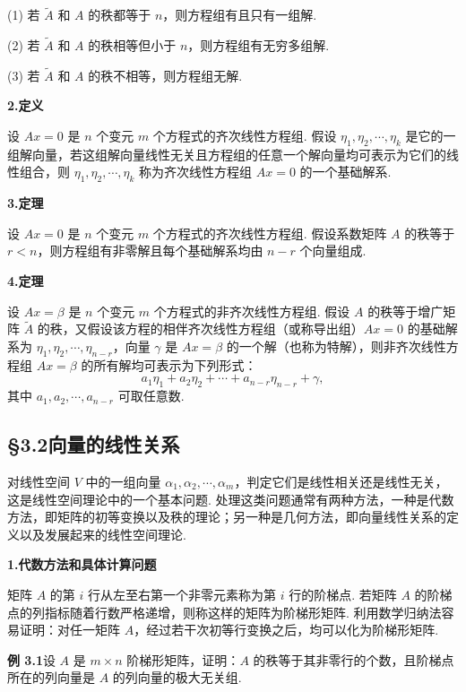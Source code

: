\documentclass[UTF8,12pt,a4paper,fontset=fandol]{ctexart}
\begin{document}
(1) 若 $\widetilde A$ 和 $A$ 的秩都等于 $n$，则方程组有且只有一组解.

(2) 若 $\widetilde A$ 和 $A$ 的秩相等但小于 $n$，则方程组有无穷多组解.

(3) 若 $\widetilde A$ 和 $A$ 的秩不相等，则方程组无解.

\noindent\textbf{2.\quad 定义}

设 $Ax=0$ 是 $n$ 个变元 $m$ 个方程式的齐次线性方程组. 假设 $\eta_1,\eta_2,\cdots,\eta_k$ 是它的一组解向量，若这组解向量线性无关且方程组的任意一个解向量均可表示为它们的线性组合，则 $\eta_1,\eta_2,\cdots,\eta_k$ 称为齐次线性方程组 $Ax=0$ 的一个基础解系.

\noindent\textbf{3.\quad 定理}

设 $Ax=0$ 是 $n$ 个变元 $m$ 个方程式的齐次线性方程组. 假设系数矩阵 $A$ 的秩等于 $r<n$，则方程组有非零解且每个基础解系均由 $n-r$ 个向量组成.

\noindent\textbf{4.\quad 定理}

设 $Ax=\beta$ 是 $n$ 个变元 $m$ 个方程式的非齐次线性方程组. 假设 $A$ 的秩等于增广矩阵 $\widetilde A$ 的秩，又假设该方程的相伴齐次线性方程组（或称导出组）$Ax=0$ 的基础解系为 $\eta_1,\eta_2,\cdots,\eta_{n-r}$，向量 $\gamma$ 是 $Ax=\beta$ 的一个解（也称为特解），则非齐次线性方程组 $Ax=\beta$ 的所有解均可表示为下列形式：
\[
a_1\eta_1+a_2\eta_2+\cdots+a_{n-r}\eta_{n-r}+\gamma,
\]
其中 $a_1,a_2,\cdots,a_{n-r}$ 可取任意数.

\subsection*{§3.2\quad 向量的线性关系}

对线性空间 $V$ 中的一组向量 $\alpha_1,\alpha_2,\cdots,\alpha_m$，判定它们是线性相关还是线性无关，这是线性空间理论中的一个基本问题. 处理这类问题通常有两种方法，一种是代数方法，即矩阵的初等变换以及秩的理论；另一种是几何方法，即向量线性关系的定义以及发展起来的线性空间理论.

\noindent\textbf{1.\quad 代数方法和具体计算问题}

矩阵 $A$ 的第 $i$ 行从左至右第一个非零元素称为第 $i$ 行的阶梯点. 若矩阵 $A$ 的阶梯点的列指标随着行数严格递增，则称这样的矩阵为阶梯形矩阵. 利用数学归纳法容易证明：对任一矩阵 $A$，经过若干次初等行变换之后，均可以化为阶梯形矩阵.

\noindent\textbf{例 3.1}\quad 设 $A$ 是 $m\times n$ 阶梯形矩阵，证明：$A$ 的秩等于其非零行的个数，且阶梯点所在的列向量是 $A$ 的列向量的极大无关组.
\end{document}
